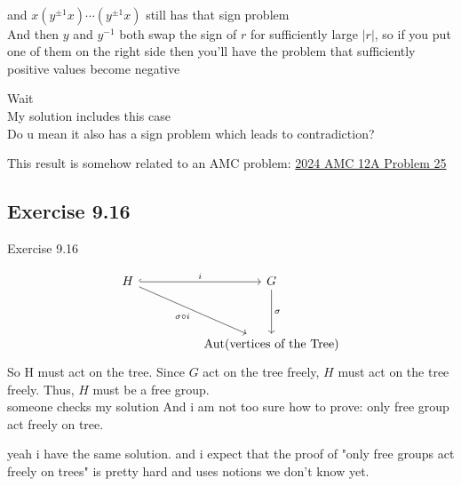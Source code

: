 \documentclass[15pt]{scrartcl}
\begin{document}
\begin{discussion*}
\begin{evie*}
        \\
        and $x(y^{\pm 1}x)\cdots (y^{\pm 1}x)$ still has that sign problem
        \\
        And then $y$ and $y^{-1}$ both swap the sign of $r$ for sufficiently large $|r|$, so if you put one of them on the right side then you'll have the problem that sufficiently positive values become negative
    \end{evie*}
    \begin{abboy*}
        Wait
        \\
        My solution includes this case
        \\
        Do u mean it also has a sign problem which leads to contradiction?
    \end{abboy*}
    \begin{abboy*}
        This result is somehow related to an AMC problem: \href{https://artofproblemsolving.com/wiki/index.php?title=2024_AMC_12A_Problems/Problem_25}{2024 AMC 12A Problem 25}
    \end{abboy*}
\end{discussion*}


\subsection{Exercise 9.16}
\begin{discussion*}Exercise 9.16
    \begin{abboy*}
        \[\begin{tikzcd}
            H && G \\
            \\
            && {\text{Aut(vertices of the Tree)}}
            \arrow["i", hook, from=1-1, to=1-3]
            \arrow["{\sigma\circ i}"', from=1-1, to=3-3]
            \arrow["\sigma", from=1-3, to=3-3]
        \end{tikzcd}\]
        So H must act on the tree. Since $G$ act on the tree freely, $H$ must act on the tree freely. Thus, $H$ must be a free group.
        \\
        someone checks my solution
        And i am not too sure how to prove: only free group act freely on tree.
    \end{abboy*}
    \begin{arthur*}
        yeah i have the same solution. and i expect that the proof of "only free groups act freely on trees" is pretty hard and uses notions we don't know yet. 
    \end{arthur*}

\end{discussion*}
\end{document}
